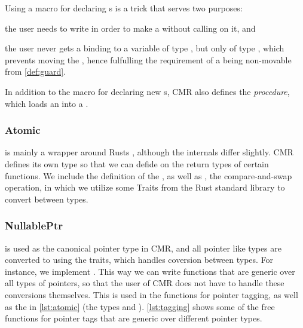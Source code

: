 Using a macro for declaring s is a trick that serves two purposes:
\begin{enumerate*}[1) ]
  \item the user needs to write  in order to make a  without calling
     on it,
  and\item the user never gets a binding to a variable of type , but only of type
    , which prevents moving the , hence fulfulling the requirement of a
     being non-movable from \cref{def:guard}.
\end{enumerate*}

In addition to the  macro for declaring new s, CMR also defines the
 \emph{procedure}, which loads an  into a .


\subsubsection{Atomic}

 is mainly a wrapper around Rusts , although the internals differ
slightly. CMR defines its own type so that we can defide on the return types of certain functions.
We include the definition of the , as well as , the compare-and-swap
operation, in which we utilize some Traits from the Rust standard library to convert between types.




\subsubsection{NullablePtr}

 is used as the canonical pointer type in CMR, and all pointer like types are
converted to  using the   traits, which
handles coversion between types. For instance, we implement . This way we can write functions that are generic over all types of pointers, so
that the user of CMR does not have to handle these conversions themselves. This is used in the
functions for pointer tagging, as well as the  in \cref{lst:atomic} (the types 
and ). \cref{lst:tagging} shows some of the free functions for pointer tags that are
generic over different pointer types.



